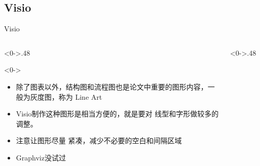 \documentclass[utf8,dvipsnames,aspectratio=169]{beamer}
\newcommand\mk[1]{{\color{RoyalBlue} #1}}
\begin{document}
\subsection{Visio}
\begin{frame}{Visio}
	\begin{columns}
		\begin{column}<0->{.48\textwidth}
			\begin{block}<0->{}
				\begin{itemize}
					\item<0-> 除了图表以外，结构图和流程图也是论文中重要的图形内容，一般为灰度图，称为\mk{Line Art}
					\item<0-> \mk{Visio}制作这种图形是相当方便的，就是要对\mk{线型和字形}做较多的调整。
					\item<0-> 注意让图形尽量\mk{紧凑}，减少不必要的空白和间隔区域
					\item<0-> \mk{Graphviz}没试过
				\end{itemize}
			\end{block}
		\end{column}
	\begin{column}<0->{.48\textwidth}
		\begin{figure}[thpb]
			\centering
			\label{fig:visio}
		\end{figure}
	\end{column}
	\end{columns}
\end{frame}
\end{document}
